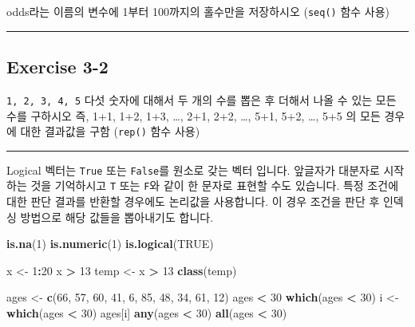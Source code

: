 \documentclass[
]{book}
\newenvironment{Shaded}{\begin{snugshade}}{\end{snugshade}}
\newcommand{\DecValTok}[1]{\textcolor[rgb]{0.00,0.00,0.81}{#1}}
\newcommand{\KeywordTok}[1]{\textcolor[rgb]{0.13,0.29,0.53}{\textbf{#1}}}
\newcommand{\NormalTok}[1]{#1}
\newcommand{\OperatorTok}[1]{\textcolor[rgb]{0.81,0.36,0.00}{\textbf{#1}}}
\newcommand{\OtherTok}[1]{\textcolor[rgb]{0.56,0.35,0.01}{#1}}
\newcommand{\StringTok}[1]{\textcolor[rgb]{0.31,0.60,0.02}{#1}}
\begin{document}
odds라는 이름의 변수에 1부터 100까지의 홀수만을 저장하시오 (\texttt{seq()} 함수 사용)

\begin{center}\rule{0.5\linewidth}{0.5pt}\end{center}

\hypertarget{exercise-3-2}{%
\subsection{Exercise 3-2}\label{exercise-3-2}}

\texttt{1,\ 2,\ 3,\ 4,\ 5} 다섯 숫자에 대해서 두 개의 수를 뽑은 후 더해서 나올 수 있는 모든 수를 구하시오 즉, 1+1, 1+2, 1+3, \ldots, 2+1, 2+2, \ldots, 5+1, 5+2, \ldots, 5+5 의 모든 경우에 대한 결과값을 구함 (\texttt{rep()} 함수 사용)

\begin{center}\rule{0.5\linewidth}{0.5pt}\end{center}

Logical 벡터는 \texttt{True} 또는 \texttt{False}를 원소로 갖는 벡터 입니다. 앞글자가 대분자로 시작하는 것을 기억하시고 \texttt{T} 또는 \texttt{F}와 같이 한 문자로 표현할 수도 있습니다. 특정 조건에 대한 판단 결과를 반환할 경우에도 논리값을 사용합니다. 이 경우 조건을 판단 후 인덱싱 방법으로 해당 값들을 뽑아내기도 합니다.

\begin{Shaded}
\begin{Highlighting}[]
\KeywordTok{is.na}\NormalTok{(}\DecValTok{1}\NormalTok{)}
\KeywordTok{is.numeric}\NormalTok{(}\DecValTok{1}\NormalTok{)}
\KeywordTok{is.logical}\NormalTok{(}\OtherTok{TRUE}\NormalTok{)}

\NormalTok{x <{-}}\StringTok{ }\DecValTok{1}\OperatorTok{:}\DecValTok{20}
\NormalTok{x }\OperatorTok{>}\StringTok{ }\DecValTok{13}
\NormalTok{temp <{-}}\StringTok{ }\NormalTok{x }\OperatorTok{>}\StringTok{ }\DecValTok{13}
\KeywordTok{class}\NormalTok{(temp)}

\NormalTok{ages <{-}}\StringTok{ }\KeywordTok{c}\NormalTok{(}\DecValTok{66}\NormalTok{, }\DecValTok{57}\NormalTok{, }\DecValTok{60}\NormalTok{, }\DecValTok{41}\NormalTok{,  }\DecValTok{6}\NormalTok{, }\DecValTok{85}\NormalTok{, }\DecValTok{48}\NormalTok{, }\DecValTok{34}\NormalTok{, }\DecValTok{61}\NormalTok{, }\DecValTok{12}\NormalTok{)}
\NormalTok{ages }\OperatorTok{<}\StringTok{ }\DecValTok{30}
\KeywordTok{which}\NormalTok{(ages }\OperatorTok{<}\StringTok{ }\DecValTok{30}\NormalTok{)}
\NormalTok{i <{-}}\StringTok{ }\KeywordTok{which}\NormalTok{(ages }\OperatorTok{<}\StringTok{ }\DecValTok{30}\NormalTok{)}
\NormalTok{ages[i]}
\KeywordTok{any}\NormalTok{(ages }\OperatorTok{<}\StringTok{ }\DecValTok{30}\NormalTok{)}
\KeywordTok{all}\NormalTok{(ages }\OperatorTok{<}\StringTok{ }\DecValTok{30}\NormalTok{)}
\end{Highlighting}
\end{Shaded}
\end{document}
